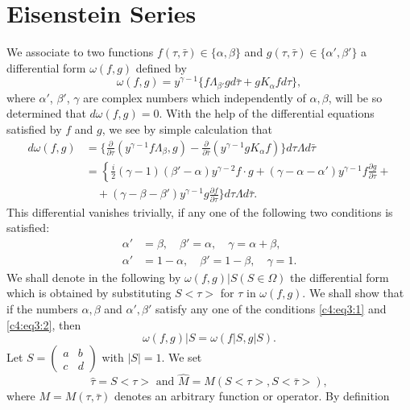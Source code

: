 \section{Eisenstein Series}\label{chap4:sec3}
We associate to two functions $f(\tau,\bar{\tau})\in \{\alpha,
\beta\}$ and $g(\tau,\bar{\tau})\in \{\alpha',\beta'\}$ a
differential form $\omega(f,g)$ defined by
$$
\omega(f,g) = y^{\gamma-1}\{f\Lambda_{\beta'} g d\bar{\tau} + g
K_{\alpha} f d\tau\},
$$
where $\alpha'$, $\beta'$, $\gamma$ are complex numbers which
independently of $\alpha, \beta$, will be so determined that
$d\omega(f,g)=0$. With the help of the differential equations
satisfied by $f$ and $g$, we see by simple calculation that 
\begin{align*}
d\omega(f,g) & = \{\frac{\partial}{\partial
  \tau}(y^{\gamma-1}f\Lambda_{\beta},g) - \frac{\partial}{\partial
  \bar{\tau}} (y^{\gamma-1} gK_{\alpha}f)\} d\tau \Lambda d
\bar{\tau}\\
& = \left\{\frac{i}{2}(\gamma-1)(\beta'-\alpha) y^{\gamma-2} f\cdot g +
(\gamma-\alpha-\alpha') y^{\gamma-1} f\frac{\partial g}{\partial
  \tau} \right. +\\
&\quad + (\gamma-\beta-\beta') y^{\gamma-1} g\frac{\partial
  f}{\partial \tau} \} d\tau \Lambda d\bar{\tau}.
\end{align*}
This \pageoriginale differential vanishes trivially, if any one of the
following two conditions is satisfied:
\begin{align*}
\alpha' & = \beta, \quad \beta' = \alpha, \quad \gamma = \alpha+
\beta, \tag{1}\label{c4:eq3:1}\\ 
\alpha' & = 1-\alpha, \quad \beta'=
1-\beta, \quad \gamma=1. \tag{2}\label{c4:eq3:2}
\end{align*}
We shall denote in the following by $\omega(f,g)|S(S\in
\Omega)$ the differential form which is obtained by substituting
$S<\tau>$ for $\tau$ in $\omega(f,g)$. We shall show that if the
numbers $\alpha, \beta$ and $\alpha', \beta'$ satisfy any one of the
conditions \eqref{c4:eq3:1} and \eqref{c4:eq3:2}, then
$$
\omega(f,g)|S = \omega(f|S, g|S).
$$
Let $S = \left(\begin{smallmatrix} a&b\\c&d \end{smallmatrix}\right)$
with $|S|=1$. We set
$$
\hat{\tau} = S<\tau> \text{ and } \hat{M} = M (S<\tau>, S <\bar{\tau}>),
$$
where $M=M(\tau,\bar{\tau})$ denotes an arbitrary function or
operator. By definition

